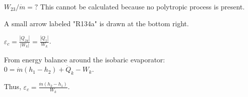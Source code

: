 \( W_{23} / \dot{m} = ? \)  
This cannot be calculated because no polytropic process is present.  

A small arrow labeled "R134a" is drawn at the bottom right.

\( \varepsilon_c = \frac{|Q_{zu}|}{|W_{k}|} = \frac{|Q_{1}|}{W_{k}} \).  

From energy balance around the isobaric evaporator:  
\( 0 = \dot{m} (h_1 - h_2) + \dot{Q}_k - W_k \).  

Thus, \( \varepsilon_c = \frac{\dot{m} (h_2 - h_1)}{W_k} \).